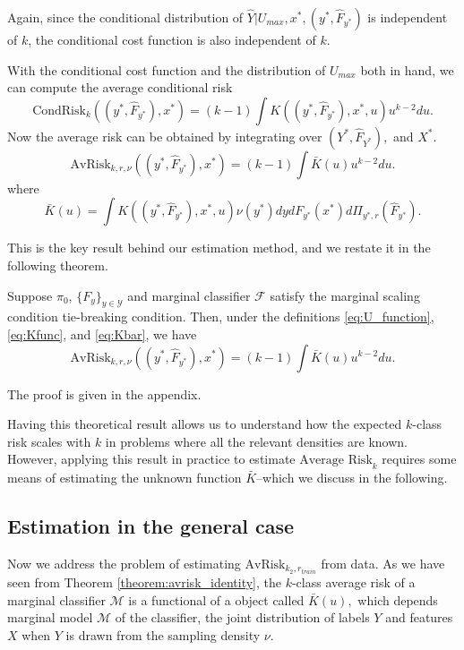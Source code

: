 \documentclass[12pt]{article}
\begin{document}
Again, since the conditional distribution of $\hat{Y}|U_{max}, x^*,
(y^*, \hat{F}_{y^*})$ is independent of $k$, the conditional cost
function is also independent of $k$.

With the conditional cost function and the distribution of $U_{max}$ both in hand, we can compute the average conditional risk
\[
\text{CondRisk}_k((y^*, \hat{F}_{y^*}), x^*) = (k-1) \int K((y^*,\hat{F}_{y^*}), x^*, u) u^{k-2} du.
\]
Now the average risk can be obtained by integrating over $(Y^*, \hat{F}_{Y^*}),$ and $X^*$.
\[
\text{AvRisk}_{k, r, \nu}((y^*, \hat{F}_{y^*}), x^*) = (k-1) \int \bar{K}(u) u^{k-2} du.
\]
where
\begin{equation}\label{eq:Kbar}
\bar{K}(u) = \int K((y^*,\hat{F}_{y^*}), x^*, u) \nu(y^*)dy dF_{y^*}(x^*) d\Pi_{y^*, r}(\hat{F}_{y^*}).
\end{equation}


This is the key result behind our estimation method, and we restate it
in the following theorem.

\begin{theorem}\label{theorem:avrisk_identity}
Suppose $\pi_0$, $\{F_y\}_{y \in \mathcal{Y}}$ and marginal classifier
$\mathcal{F}$ satisfy the marginal scaling condition tie-breaking
condition.  Then, under the
definitions \eqref{eq:U_function}, \eqref{eq:Kfunc},
and \eqref{eq:Kbar}, we have
\begin{equation}\label{eq:avrisk_identity}
\text{AvRisk}_{k, r, \nu}((y^*, \hat{F}_{y^*}), x^*) = (k-1) \int \bar{K}(u) u^{k-2} du.
\end{equation}
\end{theorem}

The proof is given in the appendix.

Having this theoretical result allows us to understand how the
expected $k$-class risk scales with $k$ in problems where all the
relevant densities are known.  However, applying this result in
practice to estimate $\text{Average Risk}_k$ requires some means of
estimating the unknown function $\bar{K}$--which we discuss in the
following.

\subsection{Estimation in the general case}\label{sec:estimation}

Now we address the problem of estimating $\text{AvRisk}_{k_2,
r_{train}}$ from data.  As we have seen from
Theorem \ref{theorem:avrisk_identity}, the $k$-class average risk of
a marginal classifier $\mathcal{M}$ is a functional of a object called
$\bar{K}(u),$ which depends marginal model $\mathcal{M}$ of the
classifier, the joint distribution of labels $Y$ and features $X$ when
$Y$ is drawn from the sampling density $\nu$.
\end{document}
